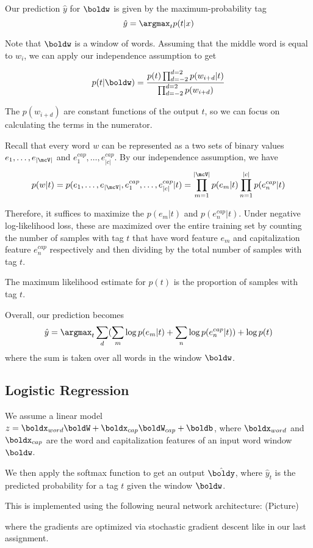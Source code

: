\documentclass[11pt]{article}
\begin{document}
Our prediction $\hat{y}$ for $\boldw$ is given by the maximum-probability tag
$$\hat{y} = \argmax_{t} p(t | x)$$

Note that $\boldw$ is a window of words. Assuming that the middle word is equal to $w_i$, we can apply our independence assumption to get 

$$p(t | \boldw) = \frac{p(t)\prod_{d=-2}^{d=2} p(w_{i+d} | t)}{\prod_{d=-2}^{d=2} p(w_{i+d})}$$

The $p(w_{i+d})$ are constant functions of the output $t$, so we can focus on calculating the terms in the numerator. 

Recall that every word $w$ can be represented as a two sets of binary values $e_1, \dots, e_{|\mcV|}$ and $e^{cap}_1, \dots, e^{cap}_{|c|}$. By our independence assumption, we have 
$$p(w | t) = p(e_1, \dots, e_{|\mcV|}, e^{cap}_1, \dots, e^{cap}_{|c|} | t) = \prod_{m=1}^{|\mcV|} p(e_m | t) \prod_{n=1}^{|c|} p(e^{cap}_n | t)$$

Therefore, it suffices to maximize the $p(e_m | t)$ and $p(e^{cap}_n | t)$. Under negative log-likelihood loss, these are maximized over the entire training set by counting the number of samples with tag $t$ that have word feature $e_m$ and capitalization feature $e^{cap}_n$ respectively and then dividing by the total number of samples with tag $t$. 

The maximum likelihood estimate for $p(t)$ is the proportion of samples with tag $t$. 

Overall, our prediction becomes
$$\hat{y} = \argmax_t \sum_d (\sum_m \log p(e_m | t) + \sum_n \log p(e^{cap}_n | t)) + \log p(t)$$
where the sum is taken over all words in the window $\boldw$. 

\subsection{Logistic Regression}

We assume a linear model $z = \boldx_{word} \boldW + \boldx_{cap} \boldW_{cap} + \boldb$, where $\boldx_{word}$ and $\boldx_{cap}$ are the word and capitalization features of an input word window $\boldw$. 

We then apply the softmax function to get an output $\hat{\boldy}$, where $\hat{y}_t$ is the predicted probability for a tag $t$ given the window $\boldw$. 

This is implemented using the following neural network architecture:
(Picture)

where the gradients are optimized via stochastic gradient descent like in our last assignment. 
\end{document}
